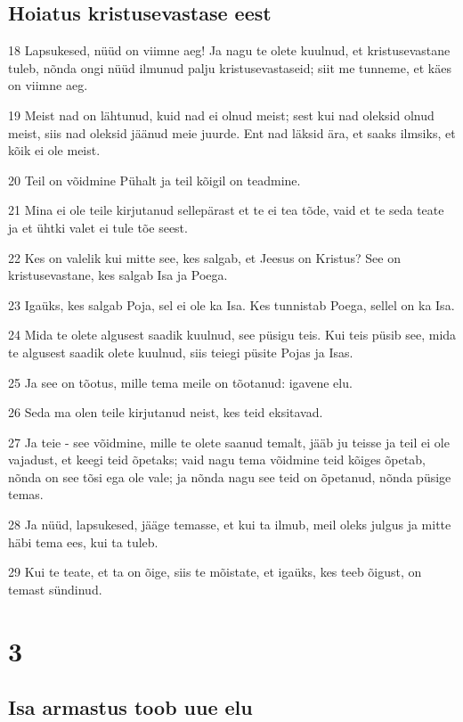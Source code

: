 \section*{Hoiatus kristusevastase eest}

\par 18 Lapsukesed, nüüd on viimne aeg! Ja nagu te olete kuulnud, et kristusevastane tuleb, nõnda ongi nüüd ilmunud palju kristusevastaseid; siit me tunneme, et käes on viimne aeg.
\par 19 Meist nad on lähtunud, kuid nad ei olnud meist; sest kui nad oleksid olnud meist, siis nad oleksid jäänud meie juurde. Ent nad läksid ära, et saaks ilmsiks, et kõik ei ole meist.
\par 20 Teil on võidmine Pühalt ja teil kõigil on teadmine.
\par 21 Mina ei ole teile kirjutanud sellepärast et te ei tea tõde, vaid et te seda teate ja et ühtki valet ei tule tõe seest.
\par 22 Kes on valelik kui mitte see, kes salgab, et Jeesus on Kristus? See on kristusevastane, kes salgab Isa ja Poega.
\par 23 Igaüks, kes salgab Poja, sel ei ole ka Isa. Kes tunnistab Poega, sellel on ka Isa.
\par 24 Mida te olete algusest saadik kuulnud, see püsigu teis. Kui teis püsib see, mida te algusest saadik olete kuulnud, siis teiegi püsite Pojas ja Isas.
\par 25 Ja see on tõotus, mille tema meile on tõotanud: igavene elu.
\par 26 Seda ma olen teile kirjutanud neist, kes teid eksitavad.
\par 27 Ja teie - see võidmine, mille te olete saanud temalt, jääb ju teisse ja teil ei ole vajadust, et keegi teid õpetaks; vaid nagu tema võidmine teid kõiges õpetab, nõnda on see tõsi ega ole vale; ja nõnda nagu see teid on õpetanud, nõnda püsige temas.
\par 28 Ja nüüd, lapsukesed, jääge temasse, et kui ta ilmub, meil oleks julgus ja mitte häbi tema ees, kui ta tuleb.
\par 29 Kui te teate, et ta on õige, siis te mõistate, et igaüks, kes teeb õigust, on temast sündinud.


\chapter{3}

\section*{Isa armastus toob uue elu}

